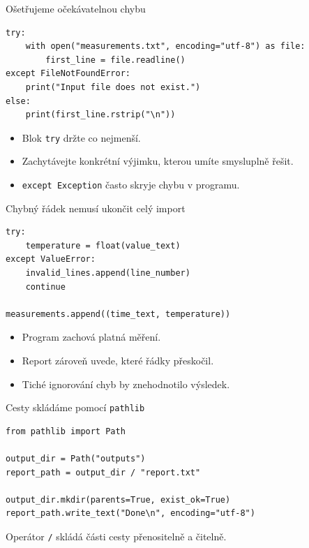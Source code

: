 \documentclass[aspectratio=169]{beamer}
\begin{document}
\begin{frame}[fragile]{Ošetřujeme očekávatelnou chybu}
\begin{lstlisting}[style=pythonSmall]
try:
    with open("measurements.txt", encoding="utf-8") as file:
        first_line = file.readline()
except FileNotFoundError:
    print("Input file does not exist.")
else:
    print(first_line.rstrip("\n"))
\end{lstlisting}
  \begin{itemize}
    \item Blok \texttt{try} držte co nejmenší.
    \item Zachytávejte konkrétní výjimku, kterou umíte smysluplně řešit.
    \item \texttt{except Exception} často skryje chybu v programu.
  \end{itemize}
\end{frame}

\begin{frame}[fragile]{Chybný řádek nemusí ukončit celý import}
\begin{lstlisting}[style=pythonSmall]
try:
    temperature = float(value_text)
except ValueError:
    invalid_lines.append(line_number)
    continue

measurements.append((time_text, temperature))
\end{lstlisting}
  \begin{itemize}
    \item Program zachová platná měření.
    \item Report zároveň uvede, které řádky přeskočil.
    \item Tiché ignorování chyb by znehodnotilo výsledek.
  \end{itemize}
\end{frame}

\begin{frame}[fragile]{Cesty skládáme pomocí \texttt{pathlib}}
\begin{lstlisting}[style=python]
from pathlib import Path

output_dir = Path("outputs")
report_path = output_dir / "report.txt"

output_dir.mkdir(parents=True, exist_ok=True)
report_path.write_text("Done\n", encoding="utf-8")
\end{lstlisting}
  Operátor \texttt{/} skládá části cesty přenositelně a čitelně.
\end{frame}
\end{document}
